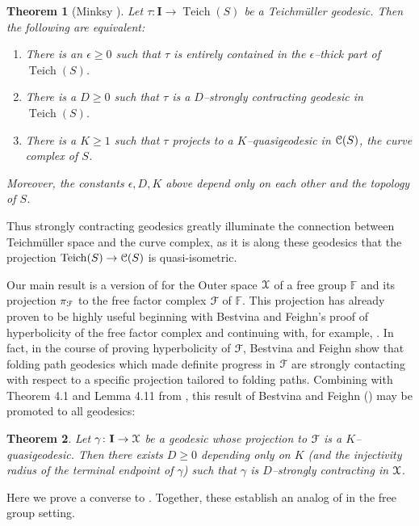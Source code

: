 \documentclass[letterpaper,fleqn]{article}
\theoremstyle{plain}
\newtheorem{theorem}{Theorem}[section]
\theoremstyle{definition}
\DeclareMathOperator{\Teich}{Teich} %
\newcommand{\T}{\Teich}
\newcommand{\C}{{\EuScript C}}
\newcommand{\free}{\mathbb{F}} %
\newcommand{\factor}{{\EuScript F}} %
\newcommand{\F}{\factor} %
\newcommand{\fc}{\factor} %
\newcommand{\os}{{\EuScript X}} %
\newcommand{\X}{\os}
\newcommand{\fproj}{\pi_\fc} %
\newcommand{\I}{\mathbf{I}}
\begin{document}
\begin{theorem}[Minksy \cite{Minsky96}] \label{th: MM}
Let $\tau: \I \to \T(S)$ be a Teichm\"{u}ller geodesic. Then the following are equivalent:
\begin{enumerate}
\item There is an $\epsilon \ge 0$ such that $\tau$ is entirely contained in the $\epsilon$--thick part of $\T(S)$.
\item There is a $D \ge 0$ such that $\tau$ is a $D$--strongly contracting geodesic in $\T(S)$.
\item There is a $K \ge 1$ such that $\tau$ projects to a $K$--quasigeodesic in $\C(S)$, the curve complex of $S$.
\end{enumerate}
Moreover, the constants $\epsilon,D,K$ above depend only on each other and the topology of $S$.
\end{theorem}
Thus strongly contracting geodesics greatly illuminate the connection between Teichm\"uller space and the curve complex, as it is along these geodesics that the projection $\T(S)\to\C(S)$ is quasi-isometric.


Our main result is a version of  for the Outer space $\X$ of a free group $\free$ and its projection $\fproj$ to the free factor complex $\F$ of $\free$. This projection has already proven to be highly useful beginning with Bestvina and Feighn's proof of hyperbolicity of the free factor complex \cite{BFhyp} and continuing with, for example, \cite{bestvina2012boundary,hamenstadt2013boundary,DT1,HorbezPoisson}. In fact, in the course of proving hyperbolicity of $\fc$, Bestvina and Feighn show that folding path geodesics which made definite progress in $\F$ are strongly contacting with respect to a specific projection tailored to folding paths. 
Combining with Theorem 4.1 and Lemma 4.11 from \cite{DT1}, this result of Bestvina and Feighn (\cite[Corollary 7.3]{BFhyp}) may be promoted to all geodesics:

\begin{theorem}\label{th: BF_contract}
Let $\gamma\colon \I \to \X$ be a geodesic whose projection to $\F$ is a $K$--quasigeodesic. Then there exists $D \ge 0$ depending only on $K$ (and the injectivity radius of the terminal endpoint of $\gamma$) such that $\gamma$ is $D$--strongly contracting in $\X$.
\end{theorem}

Here we prove a converse to . Together, these establish an analog of  in the free group setting.
\end{document}

